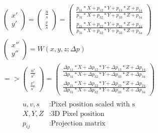 \documentclass[11pt,a4paper,titlepage,oneside]{report}
\begin{document}
\begin{equation}\label{eq:pe_projection}
	\begin{gathered}
		\begin{pmatrix}
			x' \\
			y' 
		\end{pmatrix}=
		\begin{pmatrix}
			\frac{u}{s} \\
			\frac{v}{s} 
		\end{pmatrix}=
		\begin{pmatrix}
			\frac{p_{11}*X + p_{12}*Y + p_{13}*Z + p_{14}}{p_{31}*X + p_{32}*Y + p_{33}*Z + p_{34}}  \\
			\frac{p_{21}*X + p_{22}*Y + p_{23}*Z + p_{24}}{p_{31}*X + p_{32}*Y + p_{33}*Z + p_{34}}
		\end{pmatrix}\\
		\begin{pmatrix}
			x'' \\
			y'' 
		\end{pmatrix}=W(x,y,z;\Delta p)\\
		=>\begin{pmatrix}
			\frac{u'}{s'} \\
			\frac{v'}{s'} 
		\end{pmatrix}=
		\begin{pmatrix}
			\frac{\Delta p_{11}*X + \Delta p_{12}*Y + \Delta p_{13}*Z + \Delta p_{14}}{\Delta p_{31}*X + \Delta p_{32}*Y + \Delta p_{33}*Z + \Delta p_{34}}  \\
			\frac{\Delta p_{21}*X + \Delta p_{22}*Y + \Delta p_{23}*Z + \Delta p_{24}}{\Delta p_{31}*X + \Delta p_{32}*Y + \Delta p_{33}*Z + \Delta p_{34}}
		\end{pmatrix}\\
	\end{gathered}
\end{equation}
\begin{align*}
	u,v,s			&:	\text{Pixel position scaled with s}\\
	X,Y,Z			&:	\text{3D Pixel position}\\
	p_{ij}		&:	\text{Projection matrix}\\
\end{align*}
\end{document}
